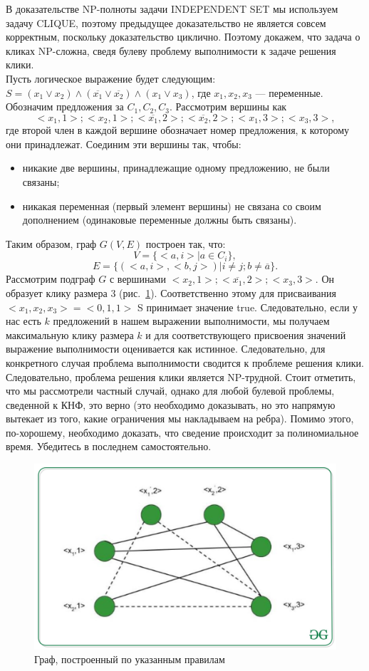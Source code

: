     \begin{Rem}
        В доказательстве \textsc{NP}-полноты задачи \textsc{INDEPENDENT SET} мы используем задачу \textsc{CLIQUE}, поэтому предыдущее доказательство не является совсем корректным, поскольку доказательство циклично. Поэтому докажем, что задача о кликах \textsc{NP}-сложна, сведя булеву проблему выполнимости к задаче решения клики.\\
        Пусть логическое выражение будет следующим: $S = (x_1 \vee x_2 ) \wedge (\overline{x_1} \vee \overline{x_2}) \wedge (x_1 \vee x_3 )$, где $x_1 , x_2 , x_3$ --- переменные. Обозначим предложения за $C_1, C_2, C_3$. Рассмотрим вершины как $$<x_1, 1>; <x_2, 1>; <\overline{x_1}, 2>; <\overline{x_2}, 2>; <x_1, 3>; <x_3, 3>,$$ где второй член в каждой вершине обозначает номер предложения, к которому они принадлежат. Соединим эти вершины так, чтобы:
        \begin{itemize}
            \item никакие две вершины, принадлежащие одному предложению, не были связаны;
            \item никакая переменная (первый элемент вершины) не связана со своим дополнением (одинаковые переменные должны быть связаны).
        \end{itemize}
        Таким образом, граф $G(V, E)$ построен так, что: $$V = \{<a, i> | a \in C_i\},$$ 
        $$E = \{(<a, i>, <b, j>) | i \neq j; b \neq \overline{a}\}.$$ 
        Рассмотрим подграф $G$ с вершинами $<x_2, 1>; <\overline{x_1}, 2>; <x_3, 3>$. Он образует клику размера 3 (рис.~\ref{ris:cliqueproblem}). Соответственно этому для присваивания  $<x_1 , x_2, x_3 > = <0, 1, 1>$ S принимает значение true. Следовательно, если у нас есть $k$ предложений в нашем выражении выполнимости, мы получаем максимальную клику размера $k$ и для соответствующего присвоения значений выражение выполнимости оценивается как истинное. Следовательно, для конкретного случая проблема выполнимости сводится к проблеме решения клики. Следовательно, проблема решения клики является \textsc{NP}-трудной. Стоит отметить, что мы рассмотрели частный случай, однако для любой булевой проблемы, сведенной к КНФ, это верно (это необходимо доказывать, но это напрямую вытекает из того, какие ограничения мы накладываем на ребра). Помимо этого, по-хорошему, необходимо доказать, что сведение происходит за полиномиальное время. Убедитесь в последнем самостоятельно.
    \end{Rem}
        \begin{figure}
            \centering
            \includegraphics[width=0.5\linewidth]{images/cliqueproblem.jpeg}
            \caption{Граф, построенный по указанным правилам}
            \label{ris:cliqueproblem}
        \end{figure}
